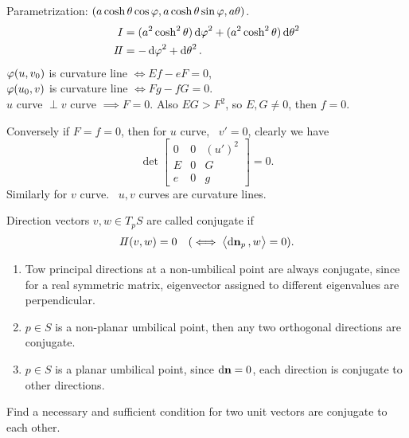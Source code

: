 \begin{example}[Catenoid]
    Parametrization: \((a\cosh\theta\cos\varphi,a\cosh\theta\sin\varphi,a\theta)\).\\
    \begin{align*}
        I&=(a^2\cosh^2\theta)\dd{\varphi}^2+(a^2\cosh^2\theta)\dd{\theta}^2 \\
        I\!I&=-\dd{\varphi}^2+\dd{\theta}^2
    .\end{align*}
    \(\varphi(u,v_0)\) is curvature line \(\iff Ef-eF=0\), \\
    \(\varphi(u_0,v)\) is curvature line \(\iff Fg-fG=0\). \\
    \(u\) curve \(\perp v\) curve \(\implies F=0\). Also \(EG>F^2\), so \(E,G\neq 
    0\), then \(f=0\).

    Conversely if \(F=f=0\), then for \(u\) curve, \ie\ \(v'= 0\),
    clearly we have \[
        \det\begin{bmatrix}
            0 & 0 & (u')^2 \\
            E & 0 & G \\
            e & 0 & g
        \end{bmatrix}=0
    .\] Similarly for \(v\) curve. \ie\ \(u,v\) curves are curvature lines.
\end{example}

\begin{definition}
    Direction vectors \(v,w\in T_p S\) are called conjugate if \[
        I\!I(v,w)=0 \quad (\iff \left<\dd{\vb{n}}_p,w\right> =0)
    .\] 
\end{definition}
\begin{example}
\begin{enumerate}[(1)]
    \item 
    Tow principal directions at a non-umbilical point are always conjugate,
    since for a real symmetric matrix, eigenvector assigned to different
    eigenvalues are perpendicular.
    \item 
    \(p\in S\) is a non-planar umbilical point, then any two orthogonal directions
    are conjugate.
    \item 
    \(p\in S\) is a planar umbilical point, since \(\dd{\vb{n}}=0\), each direction
    is conjugate to other directions.
\end{enumerate}
\end{example}

\begin{exercise}
    Find a necessary and sufficient condition for two unit vectors are conjugate
    to each other.
\end{exercise}


